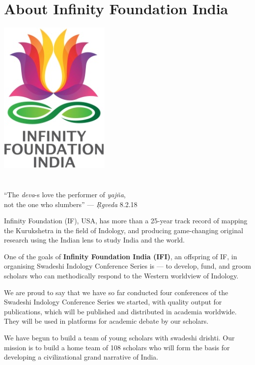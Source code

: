 
\chapter*{About Infinity Foundation India}

\begin{center}
 \includegraphics[scale=0.23]{"images/logo.png"}\\\\\\
 “The \textit{deva}-s love the performer of \textit{yajña},\\ 
 not the one who slumbers” — \textit{Ṛgveda} 8.2.18
\end{center}

Infinity Foundation (IF), USA, has more than a 25-year track record of mapping the Kurukshetra in the field of Indology, and producing game-changing original research using the Indian lens to study India and the world.

One of the goals of \textbf{Infinity Foundation India (IFI)}, an offspring of IF, in organising Swadeshi Indology Conference Series is — to develop, fund, and groom scholars who can methodically respond to the Western worldview of Indology.

We are proud to say that we have so far conducted four conferences of the Swadeshi Indology Conference Series we started, with quality output for publications, which will be published and distributed in academia worldwide. They will be used in platforms for academic debate by our scholars.

We have begun to build a team of young scholars with swadeshi drishti. Our mission is to build a home team of 108 scholars who will form the basis for developing a civilizational grand narrative of India.

